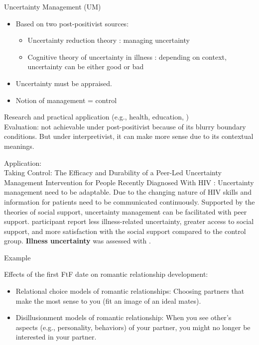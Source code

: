 \documentclass[
]{book}
\providecommand{\tightlist}{%
  \setlength{\itemsep}{0pt}\setlength{\parskip}{0pt}}
\begin{document}
Uncertainty Management (UM)

\begin{itemize}
\item
  Based on two post-positivist sources:

  \begin{itemize}
  \tightlist
  \item
    Uncertainty reduction theory \citep{BERGER_1975}: managing uncertainty
  \item
    Cognitive theory of uncertainty in illness \citep{Mishel_1990}: depending on context, uncertainty can be either good
    or bad
  \end{itemize}
\item
  Uncertainty must be appraised.
\item
  Notion of management = control
\end{itemize}

Research and practical application (e.g., health, education, )\\
Evaluation: not achievable under post-positivist because of its blurry boundary conditions. But under interpretivist, it
can make more sense due to its contextual meanings.

Application:\\
Taking Control: The Efficacy and Durability of a Peer-Led Uncertainty Management Intervention for People Recently
Diagnosed With HIV \citep{Brashers_2016}: Uncertainty management need to be adaptable. Due to the changing nature of HIV
skills and information for patients need to be communicated continuously. Supported by the theories of social support,
uncertainty management can be facilitated with peer support. participant report less illness-related uncertainty,
greater access to social support, and more satisfaction with the social support compared to the control group. \textbf{Illness
uncertainty} was assessed with \citep{MISHEL_1981}.

Example

\citep{SHARABI_2017} Effects of the first FtF date on romantic relationship development:

\begin{itemize}
\tightlist
\item
  Relational choice models of romantic relationships: Choosing partners that make the most sense to you (fit an image
  of an ideal mates).
\item
  Disillusionment models of romantic relationship: When you see other's aspects (e.g., personality, behaviors) of your
  partner, you might no longer be interested in your partner.
\end{itemize}
\end{document}
